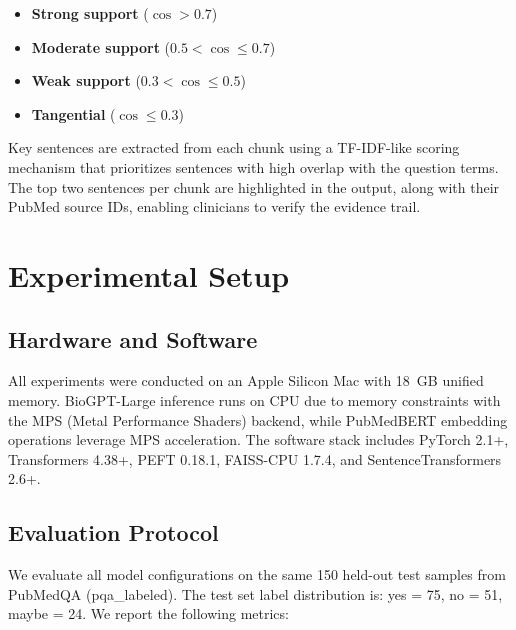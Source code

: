 \documentclass[conference]{IEEEtran}
\begin{document}
\begin{itemize}[leftmargin=*]
    \item \textbf{Strong support} ($\cos > 0.7$)
    \item \textbf{Moderate support} ($0.5 < \cos \leq 0.7$)
    \item \textbf{Weak support} ($0.3 < \cos \leq 0.5$)
    \item \textbf{Tangential} ($\cos \leq 0.3$)
\end{itemize}

Key sentences are extracted from each chunk using a TF-IDF-like scoring mechanism that prioritizes sentences with high overlap with the question terms. The top two sentences per chunk are highlighted in the output, along with their PubMed source IDs, enabling clinicians to verify the evidence trail.


\section{Experimental Setup}

\subsection{Hardware and Software}

All experiments were conducted on an Apple Silicon Mac with 18~GB unified memory. BioGPT-Large inference runs on CPU due to memory constraints with the MPS (Metal Performance Shaders) backend, while PubMedBERT embedding operations leverage MPS acceleration. The software stack includes PyTorch 2.1+, Transformers 4.38+, PEFT 0.18.1, FAISS-CPU 1.7.4, and SentenceTransformers 2.6+.

\subsection{Evaluation Protocol}

We evaluate all model configurations on the same 150 held-out test samples from PubMedQA (pqa\_labeled). The test set label distribution is: yes = 75, no = 51, maybe = 24. We report the following metrics:
\end{document}
